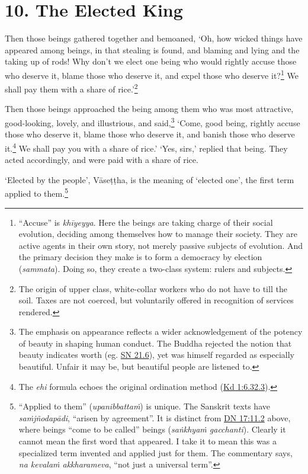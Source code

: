 \documentclass[12pt,openany]{book}%
\begin{document}
\section*{10. The Elected King }

Then those beings gathered together and bemoaned, ‘Oh, how wicked things have appeared among beings, in that stealing is found, and blaming and lying and the taking up of rods! Why don’t we elect one being who would rightly accuse those who deserve it, blame those who deserve it, and expel those who deserve it?\footnote{“Accuse” is \textit{\textsanskrit{khīyeyya}}. Here the beings are taking charge of their social evolution, deciding among themselves how to manage their society. They are active agents in their own story, not merely passive subjects of evolution. And the primary decision they make is to form a democracy by election (\textit{sammata}). Doing so, they create a two-class system: rulers and subjects. } We shall pay them with a share of rice.’\footnote{The origin of upper class, white-collar workers who do not have to till the soil. Taxes are not coerced, but voluntarily offered in recognition of services rendered. } 

Then those beings approached the being among them who was most attractive, good-looking, lovely, and illustrious, and said,\footnote{The emphasis on appearance reflects a wider acknowledgement of the potency of beauty in shaping human conduct. The Buddha rejected the notion that beauty indicates worth (eg. \href{https://suttacentral.net/sn21.6/en/sujato}{SN 21.6}), yet was himself regarded as especially beautiful. Unfair it may be, but beautiful people are listened to. } ‘Come, good being, rightly accuse those who deserve it, blame those who deserve it, and banish those who deserve it.\footnote{The \textit{ehi} formula echoes the original ordination method (\href{https://suttacentral.net/pli-tv-kd1/en/sujato\#6.32.3}{Kd 1:6.32.3}). } We shall pay you with a share of rice.’ ‘Yes, sirs,’ replied that being. They acted accordingly, and were paid with a share of rice. 

‘Elected by the people’, \textsanskrit{Vāseṭṭha}, is the meaning of ‘elected one’, the first term applied to them.\footnote{“Applied to them” (\textit{\textsanskrit{upanibbattaṁ}}) is unique. The Sanskrit texts have \textit{\textsanskrit{saṁjñodapādi}}, “arisen by agreement”. It is distinct from \href{https://suttacentral.net/dn17/en/sujato\#11.2}{DN 17:11.2} above, where beings “come to be called” beings (\textit{\textsanskrit{saṅkhyaṁ} gacchanti}). Clearly it cannot mean the first word that appeared. I take it to mean this was a specialized term invented and applied just for them. The commentary says, \textit{na \textsanskrit{kevalaṁ} akkharameva}, “not just a universal term”. } 
\end{document}
